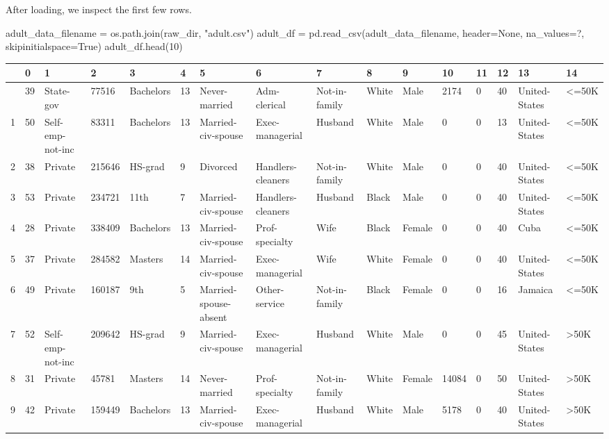 \documentclass[
  letterpaper,
  DIV=11,
  numbers=noendperiod]{scrartcl}
\newenvironment{Shaded}{\begin{snugshade}}{\end{snugshade}}
\newcommand{\DecValTok}[1]{\textcolor[rgb]{0.68,0.00,0.00}{#1}}
\newcommand{\NormalTok}[1]{\textcolor[rgb]{0.00,0.23,0.31}{#1}}
\newcommand{\OperatorTok}[1]{\textcolor[rgb]{0.37,0.37,0.37}{#1}}
\newcommand{\StringTok}[1]{\textcolor[rgb]{0.13,0.47,0.30}{#1}}
\newcommand{\VariableTok}[1]{\textcolor[rgb]{0.07,0.07,0.07}{#1}}
\begin{document}
After loading, we inspect the first few rows.

\begin{Shaded}
\begin{Highlighting}[]
\NormalTok{adult\_data\_filename }\OperatorTok{=}\NormalTok{ os.path.join(raw\_dir, }\StringTok{"adult.csv"}\NormalTok{)}
\NormalTok{adult\_df }\OperatorTok{=}\NormalTok{ pd.read\_csv(adult\_data\_filename, header}\OperatorTok{=}\VariableTok{None}\NormalTok{, na\_values}\OperatorTok{=}\StringTok{\textquotesingle{}?\textquotesingle{}}\NormalTok{, skipinitialspace}\OperatorTok{=}\VariableTok{True}\NormalTok{)}
\NormalTok{adult\_df.head(}\DecValTok{10}\NormalTok{)}
\end{Highlighting}
\end{Shaded}

\begin{longtable}[]{@{}llllllllllllllll@{}}
\toprule\noalign{}
& 0 & 1 & 2 & 3 & 4 & 5 & 6 & 7 & 8 & 9 & 10 & 11 & 12 & 13 & 14 \\
\midrule\noalign{}
\endhead
\bottomrule\noalign{}
\endlastfoot
0 & 39 & State-gov & 77516 & Bachelors & 13 & Never-married &
Adm-clerical & Not-in-family & White & Male & 2174 & 0 & 40 &
United-States & \textless=50K \\
1 & 50 & Self-emp-not-inc & 83311 & Bachelors & 13 & Married-civ-spouse
& Exec-managerial & Husband & White & Male & 0 & 0 & 13 & United-States
& \textless=50K \\
2 & 38 & Private & 215646 & HS-grad & 9 & Divorced & Handlers-cleaners &
Not-in-family & White & Male & 0 & 0 & 40 & United-States &
\textless=50K \\
3 & 53 & Private & 234721 & 11th & 7 & Married-civ-spouse &
Handlers-cleaners & Husband & Black & Male & 0 & 0 & 40 & United-States
& \textless=50K \\
4 & 28 & Private & 338409 & Bachelors & 13 & Married-civ-spouse &
Prof-specialty & Wife & Black & Female & 0 & 0 & 40 & Cuba &
\textless=50K \\
5 & 37 & Private & 284582 & Masters & 14 & Married-civ-spouse &
Exec-managerial & Wife & White & Female & 0 & 0 & 40 & United-States &
\textless=50K \\
6 & 49 & Private & 160187 & 9th & 5 & Married-spouse-absent &
Other-service & Not-in-family & Black & Female & 0 & 0 & 16 & Jamaica &
\textless=50K \\
7 & 52 & Self-emp-not-inc & 209642 & HS-grad & 9 & Married-civ-spouse &
Exec-managerial & Husband & White & Male & 0 & 0 & 45 & United-States &
\textgreater50K \\
8 & 31 & Private & 45781 & Masters & 14 & Never-married & Prof-specialty
& Not-in-family & White & Female & 14084 & 0 & 50 & United-States &
\textgreater50K \\
9 & 42 & Private & 159449 & Bachelors & 13 & Married-civ-spouse &
Exec-managerial & Husband & White & Male & 5178 & 0 & 40 & United-States
& \textgreater50K \\
\end{longtable}
\end{document}
